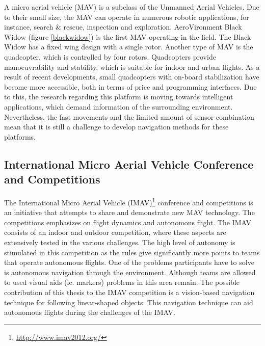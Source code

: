 \documentclass[a4paper]{article}
\begin{document}
A micro aerial vehicle (MAV) is a subclass of the Unmanned Aerial Vehicles. Due to their small size, the MAV can operate in numerous robotic applications, for instance, search \&  rescue, inspection and exploration. AeroVironment Black Widow \cite{Grasmeyer2001} (figure \ref{blackwidow}) is the first MAV operating in the field. The Black Widow has a fixed wing design with a single rotor. Another type of MAV is the quadcopter, which is controlled by four rotors. Quadcopters provide manoeuvrability and stability, which is suitable for indoor and urban flights. As a result of recent developments, small quadcopters with on-board stabilization have become more accessible, both in terms of price and programming interfaces. Due to this, the research regarding this platform is moving towards intelligent applications, which demand information of the surrounding environment. Nevertheless, the fast movements and the limited amount of sensor combination mean that it is still a challenge to develop navigation methods for these platforms.

\subsection{International Micro Aerial Vehicle Conference and Competitions}
The International Micro Aerial Vehicle (IMAV)\footnote{\url{http://www.imav2012.org/}} conference and competitions is an initiative that attempts to share and demonstrate new MAV technology. The competitions emphasizes on flight dynamics and autonomous flight. The IMAV consists of an indoor and outdoor competition, where these aspects are extensively tested in the various challenges. The high level of autonomy is stimulated in this competition as the rules give significantly more points to teams that operate autonomous flights. One of the problems participants have to solve is autonomous navigation through the environment. Although teams are allowed to used visual aids (ie. markers) problems in this area remain. The possible contribution of this thesis to the IMAV competition is a vision-based navigation technique for following linear-shaped objects. This navigation technique can aid autonomous flights during the challenges of the IMAV.
\end{document}
